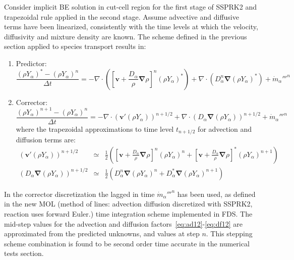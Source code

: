 \documentclass[12pt]{article}
\begin{document}
Consider implicit BE solution in cut-cell region for the first stage of SSPRK2 and trapezoidal rule applied in the second stage. Assume advective and diffusive terms have been linearized, consistently with the time levels at which the velocity, diffusivity and mixture density are known. The scheme defined in the previous section applied to species transport results in:
%
\begin{enumerate}
  \item Predictor:
%
\begin{equation}
\frac{ (\rho Y_\alpha)^{*} - (\rho Y_\alpha)^n}{\Delta t} = - \nabla \cdot \left(  \left[ \mathbf{v} +
\frac{D_\alpha}{\rho} \boldsymbol{\nabla} \rho \right]^{n} (\rho Y_\alpha)^{*} \right) +
\nabla \cdot \left( D_\alpha^n \boldsymbol{\nabla}  (\rho Y_\alpha )^{*} \right) + \dot{m}_\alpha'''^{n} \label{eq:pred}
\end{equation}
%
  \item Corrector:
%
\begin{equation}
\frac{ (\rho Y_\alpha)^{n+1} - (\rho Y_\alpha)^n}{\Delta t} = - \nabla \cdot \left(  \mathbf{v}' (\rho Y_\alpha) \right)^{n+1/2} + \nabla \cdot \left( D_\alpha \boldsymbol{\nabla}  (\rho Y_\alpha ) \right)^{n+1/2} + \dot{m}_\alpha'''^{n} \label{eq:corr}
\end{equation}
%
where the trapezoidal approximations to time level $t_{n+1/2}$ for advection and diffusion terms are:
%
\begin{eqnarray}
  \left(  \mathbf{v}'(\rho Y_\alpha) \right)^{n+1/2} & \simeq &
  \frac{1}{2} \left( \left[ \mathbf{v} + \frac{D_\alpha}{\rho} \boldsymbol{\nabla} \rho \right]^n (\rho Y_\alpha)^{n} +
                           \left[ \mathbf{v} + \frac{D_\alpha}{\rho} \boldsymbol{\nabla} \rho \right]^* (\rho Y_\alpha)^{n+1} \right)
                           \label{eq:ad12}  \\
  \left( D_\alpha \boldsymbol{\nabla}  (\rho Y_\alpha ) \right)^{n+1/2}   & \simeq &
  \frac{1}{2} \left(  D_\alpha^{n} \boldsymbol{\nabla}  (\rho Y_\alpha )^{n} +
                            D_\alpha^* \boldsymbol{\nabla}  (\rho Y_\alpha )^{n+1}  \right) \label{eq:df12}
\end{eqnarray}
%
\end{enumerate}
%
In the corrector discretization the lagged in time $\dot{m}_\alpha'''^{n}$ has been used, as defined in the new MOL (method of lines: advection diffusion discretized with SSPRK2, reaction uses forward Euler.) time integration scheme implemented in FDS. The mid-step values for the advection and diffusion factors~\eqref{eq:ad12}-\eqref{eq:df12} are approximated from the predicted unknowns, and values at step $n$. This stepping scheme combination is found to be second order time accurate in the numerical tests section.
\end{document}
